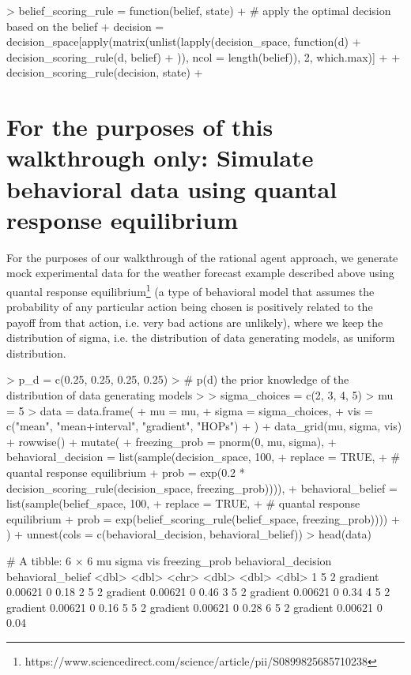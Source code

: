 \documentclass{article}
\begin{document}
\begin{Schunk}
\begin{Sinput}
> belief_scoring_rule = function(belief, state) {
+   # apply the optimal decision based on the belief
+   decision = decision_space[apply(matrix(unlist(lapply(decision_space, function(d) {
+       decision_scoring_rule(d, belief)
+   })), ncol = length(belief)), 2, which.max)]
+   
+   decision_scoring_rule(decision, state)
+ }
\end{Sinput}
\end{Schunk}

\section{For the purposes of this walkthrough only: Simulate behavioral data using quantal response equilibrium}

For the purposes of our walkthrough of the rational agent approach, we generate mock experimental data for the weather forecast example described above using quantal response equilibrium\footnote{https://www.sciencedirect.com/science/article/pii/S0899825685710238} (a type of behavioral model that assumes the probability of any particular action being chosen is positively related to the payoff from that action, i.e. very bad actions are unlikely), where we keep the distribution of sigma, i.e. the distribution of data generating models, as uniform distribution.

\begin{Schunk}
\begin{Sinput}
> p_d = c(0.25, 0.25, 0.25, 0.25)
> # p(d) the prior knowledge of the distribution of data generating models
> 
> sigma_choices = c(2, 3, 4, 5)
> mu = 5
> data = data.frame(
+   mu = mu, 
+   sigma = sigma_choices,
+   vis = c("mean", "mean+interval", "gradient", "HOPs")
+ ) %>% 
+   data_grid(mu, sigma, vis) %>% 
+   rowwise() %>%
+   mutate(
+     freezing_prob = pnorm(0, mu, sigma),
+     behavioral_decision = list(sample(decision_space, 100, 
+       replace = TRUE, 
+       # quantal response equilibrium
+       prob = exp(0.2 * decision_scoring_rule(decision_space, freezing_prob)))),
+     behavioral_belief = list(sample(belief_space, 100, 
+       replace = TRUE, 
+       # quantal response equilibrium
+       prob = exp(belief_scoring_rule(belief_space, freezing_prob))))
+   ) %>%
+   unnest(cols = c(behavioral_decision, behavioral_belief))
> head(data)
\end{Sinput}
\begin{Soutput}
# A tibble: 6 × 6
     mu sigma vis      freezing_prob behavioral_decision behavioral_belief
  <dbl> <dbl> <chr>            <dbl>               <dbl>             <dbl>
1     5     2 gradient       0.00621                   0              0.18
2     5     2 gradient       0.00621                   0              0.46
3     5     2 gradient       0.00621                   0              0.34
4     5     2 gradient       0.00621                   0              0.16
5     5     2 gradient       0.00621                   0              0.28
6     5     2 gradient       0.00621                   0              0.04
\end{Soutput}
\end{Schunk}
\end{document}
